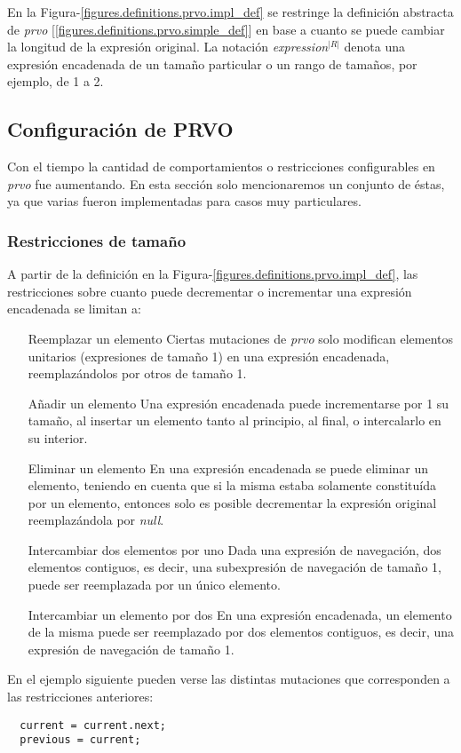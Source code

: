 En la Figura-\ref{figures.definitions.prvo.impl_def} se restringe la definici\'on abstracta de \emph{prvo} [\ref{figures.definitions.prvo.simple_def}] en base a cuanto se puede cambiar la longitud de la expresi\'on original. La notaci\'on \emph{expression$^{|R|}$} denota una expresi\'on encadenada de un tama\~no particular o un rango de tama\~nos, por ejemplo, de 1 a 2.

\subsection{Configuraci\'on de PRVO}

Con el tiempo la cantidad de comportamientos o restricciones configurables en \emph{prvo} fue aumentando. En esta secci\'on solo mencionaremos un conjunto de \'estas, ya que varias fueron implementadas para casos muy particulares.

\subsubsection{Restricciones de tama\~no}

A partir de la definici\'on en la Figura-\ref{figures.definitions.prvo.impl_def}, las restricciones sobre cuanto puede decrementar o incrementar una expresi\'on encadenada se limitan a:

\begin{enumerate}
	\item[Reemplazar un elemento] Ciertas mutaciones de \emph{prvo} solo modifican elementos unitarios (expresiones de tama\~no 1) en una expresi\'on encadenada, reemplaz\'andolos por otros de tama\~no 1.
	\item[A\~nadir un elemento] Una expresi\'on encadenada puede incrementarse por 1 su tama\~no, al insertar un elemento tanto al principio, al final, o intercalarlo en su interior.
	\item[Eliminar un elemento] En una expresi\'on encadenada se puede eliminar un elemento, teniendo en cuenta que si la misma estaba solamente constitu\'ida por un elemento, entonces solo es posible decrementar la expresi\'on original reemplaz\'andola por \emph{null}.
	\item[Intercambiar dos elementos por uno] Dada una expresi\'on de navegaci\'on, dos elementos contiguos, es decir, una subexpresi\'on de navegaci\'on de tama\~no 1, puede ser reemplazada por un \'unico elemento.
	\item[Intercambiar un elemento por dos] En una expresi\'on encadenada, un elemento de la misma puede ser reemplazado por dos elementos contiguos, es decir, una expresi\'on de navegaci\'on de tama\~no 1.
\end{enumerate}

En el ejemplo siguiente pueden verse las distintas mutaciones que corresponden a las restricciones anteriores:
\begin{lstlisting}
  current = current.next;
  previous = current;
\end{lstlisting}